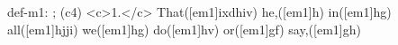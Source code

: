 def-m1: \grealign;
(c4) <c>1.</c> That([em1]ixdhiv) he,([em1]h) in([em1]hg) all([em1]hjji) we([em1]hg) do([em1]hv) or([em1]gf) say,([em1]gh)